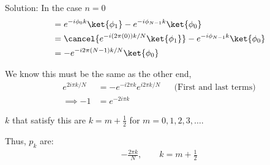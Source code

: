 \begin{homeworkProblem}
\begin{enumerate}[(a)]
\begin{callout}{Solution:}
                In the case $n=0$
                \begin{align*}
                  &= e^{-i\phi_{0}k}\ket{\phi_{1}} - e^{-i\phi_{N-1}k}\ket{\phi_{0}} \\
                  &= \cancel{e^{-i (2\pi (0) ) k / N}\ket{\phi_{1}}} - e^{-i\phi_{N-1}k}\ket{\phi_{0}} \\
                  &= - e^{-i 2\pi (N-1) k / N}\ket{\phi_{0}}
                \end{align*}

                We know this must be the same as the other end,
                \begin{align*}
                    e^{2 i \pi k / N} &= - e^{-i 2\pi k} e^{i 2\pi k / N} &&\text{(First and last terms)} \\
                    \implies -1 &= e^{-2 i \pi k} 
                \end{align*}

                $k$ that satisfy this are $k=m+ \frac{1}{2}$ for $m=0,1,2,3,\dots$.

                Thus, $p_k$ are:
                \begin{align*}
                    \boxed{- \frac{2\pi k}{N}, \qquad k=m+\frac{1}{2}}
                \end{align*}

            \end{callout}
    \end{enumerate}
\end{homeworkProblem}

